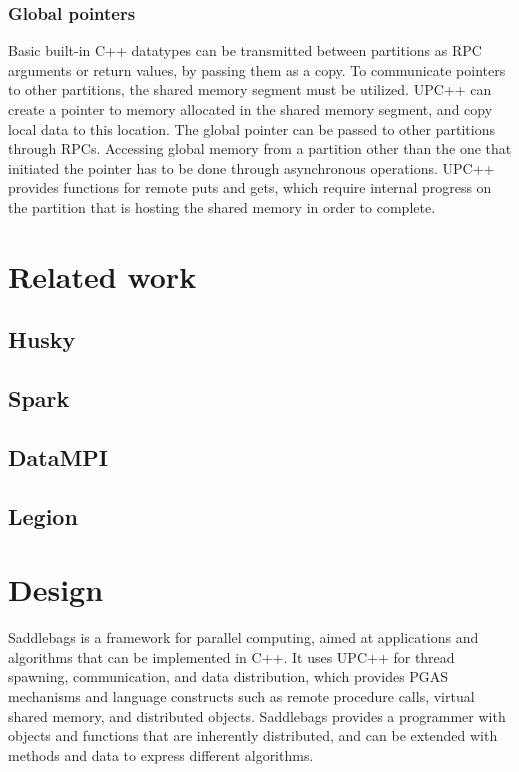 \documentclass{uit-report}
\begin{document}
\subsubsection{Global pointers}
Basic built-in C++ datatypes can be transmitted between partitions as RPC arguments or return values, by passing them as a copy. To communicate pointers to other partitions, the shared memory segment must be utilized. UPC++ can create a pointer to memory allocated in the shared memory segment, and copy local data to this location. The global pointer can be passed to other partitions through RPCs. Accessing global memory from a partition other than the one that initiated the pointer has to be done through asynchronous operations. UPC++ provides functions for remote puts and gets, which require internal progress on the partition that is hosting the shared memory in order to complete.

\newpage
\section{Related work}
\subsection{Husky}
\subsection{Spark}
\subsection{DataMPI}
\subsection{Legion}

\newpage
\section{Design}
Saddlebags is a framework for parallel computing, aimed at applications and algorithms that can be implemented in C++. It uses UPC++ for thread spawning, communication, and data distribution, which provides PGAS mechanisms and language constructs such as remote procedure calls, virtual shared memory, and distributed objects. Saddlebags provides a programmer with objects and functions that are inherently distributed, and can be extended with methods and data to express different algorithms.
\end{document}
